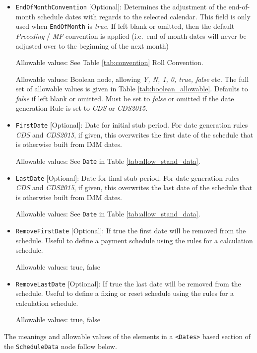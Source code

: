 \begin{itemize}
\item \lstinline!EndOfMonthConvention! [Optional]: Determines the adjustment of the end-of-month schedule dates with regards to the selected calendar.
This field is only used when \lstinline!EndOfMonth! is \emph{true}. If left blank or omitted, then the default \emph{Preceding} / \emph{MF} convention is applied
(i.e.\ end-of-month dates will never be adjusted over to the beginning of the next month)

Allowable values: See Table \ref{tab:convention} Roll Convention.

Allowable values: Boolean node, allowing \emph{Y, N, 1, 0, true, false} etc. The full set of allowable values is given in Table \ref{tab:boolean_allowable}. Defaults to \emph{false} if left blank or omitted. Must be set to \emph{false} or omitted if the date generation Rule is set to \emph{CDS} or \emph{CDS2015}.

\item \lstinline!FirstDate! [Optional]: Date for initial stub period. For date generation rules \emph{CDS} and \emph{CDS2015}, if given, this
  overwrites the first date of the schedule that is otherwise built from IMM dates.

Allowable values: See \lstinline!Date! in Table \ref{tab:allow_stand_data}.

\item \lstinline!LastDate! [Optional]: Date for final stub period. For date generation rules \emph{CDS} and \emph{CDS2015}, if given, this
  overwrites the last date of the schedule that is otherwise built from IMM dates.

Allowable values: See \lstinline!Date! in Table \ref{tab:allow_stand_data}.

\item \lstinline!RemoveFirstDate! [Optional]: If true the first date will be removed from the schedule. Useful to define a payment schedule using the rules for a calculation schedule.

Allowable values: true, false

\item \lstinline!RemoveLastDate! [Optional]: If true the last date will be removed from the schedule. Useful to define a fixing or reset schedule using the rules for a calculation schedule.

Allowable values: true, false

\end{itemize}

\medskip
The meanings and allowable values of the elements in a {\tt <Dates>} based section of the  \lstinline!ScheduleData! node follow below.

